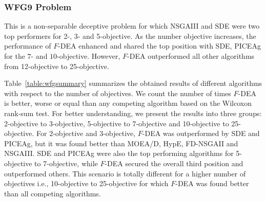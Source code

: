 \documentclass[review]{elsarticle}
\begin{document}
%
\subsubsection{WFG9 Problem}

This is a non-separable deceptive problem for which NSGAIII and SDE were two top performers for
2-, 3- and 5-objective.  As the number objective increases, the performance of $F$-DEA enhanced and shared the 
top position with  SDE, PICEAg for the $7$- and $10$-objective. However, $F$-DEA outperformed all other algorithms from 12-objective to 25-objective.



Table~\ref{table:wfgsummary} summarizes the obtained results of different algorithms with respect to the number of objectives.
We count the number of times $F$-DEA is better, worse or equal than any competing algorithm based on the Wilcoxon rank-sum test. For better 
understanding, we present the results into three groups: 2-objective to 3-objective, 5-objective to 7-objective and 10-objective to 25-objective. For 2-objective and 3-objective,
 $F$-DEA was outperformed by SDE and PICEAg, but it was found better than MOEA/D, HypE, FD-NSGAII and NSGAIII. SDE and PICEAg were also the top performing algorithms for 5-objective to 
 7-objective, while $F$-DEA secured the overall third position and outperformed others. This scenario is totally different for a higher number of objectives i.e., 10-objective to 25-objective for which $F$-DEA was found better than all competing algorithms. 

\end{document}
